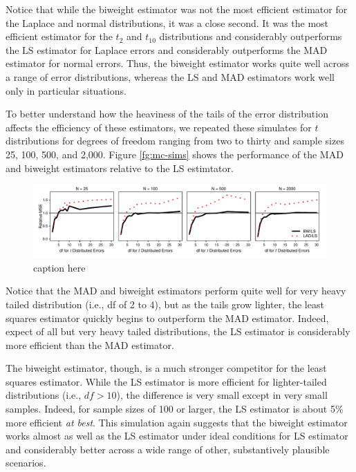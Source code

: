 \documentclass[12pt]{article}
\begin{document}
Notice that while the biweight estimator was not the most efficient estimator for the Laplace and normal distributions, it was a close second. It was the most efficient estimator for the $t_2$ and $t_10$ distributions and considerably outperforms the LS estimator for Laplace errors and considerably outperforms the MAD estimator for normal errors. Thus, the biweight estimator works quite well across a range of error distributions, whereas the LS and MAD estimators work well only in particular situations.

To better understand how the heaviness of the tails of the error distribution affects the efficiency of these estimators, we repeated these simulates for $t$ distributions for degrees of freedom ranging from two to thirty and sample sizes 25, 100, 500, and 2,000. Figure \ref{fg:mc-sims} shows the performance of the MAD and biweight estimators relative to the LS estimtator.

\begin{figure}[h!]
\begin{center}
\includegraphics[width = \textwidth]{figs/mc-sims.pdf}
\caption{caption here}\label{fig:mc-sims}
\end{center}
\end{figure}

Notice that the MAD and biweight estimators perform quite well for very heavy tailed distribution (i.e., df of 2 to 4), but as the tails grow lighter, the least squares estimator quickly begins to outperform the MAD estimator. Indeed, expect of all but very heavy tailed distributions, the LS estimator is considerably more efficient than the MAD estimator. 

The biweight estimator, though, is a much stronger competitor for the least squares estimator. While the LS estimator is more efficient for lighter-tailed distributions (i.e., $df > 10$), the difference is very small except in very small samples. Indeed, for sample sizes of 100 or larger, the LS estimator is about 5\% more efficient \textit{at best}. This simulation again suggests that the biweight estimator works almost as well as the LS estimator under ideal conditions for LS estimator and considerably better across a wide range of other, substantively plausible scenarios.
\end{document}
